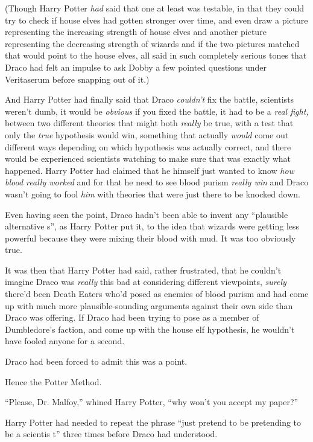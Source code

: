 (Though Harry Potter \emph{had} said that one at least was testable, in that they could try to check if house elves had gotten stronger over time, and even draw a picture representing the increasing strength of house elves and another picture representing the decreasing strength of wizards and if the two pictures matched that would point to the house elves, all said in such completely serious tones that Draco had felt an impulse to ask Dobby a few pointed questions under Veritaserum before snapping out of it.)

And Harry Potter had finally said that Draco \emph{couldn't} fix the battle, scientists weren't dumb, it would be \emph{obvious} if you fixed the battle, it had to be a \emph{real fight,} between two different theories that might both \emph{really} be true, with a test that only the \emph{true} hypothesis would win, something that actually \emph{would} come out different ways depending on which hypothesis was actually correct, and there would be experienced scientists watching to make sure that was exactly what happened. Harry Potter had claimed that he himself just wanted to know \emph{how blood really worked} and for that he need to see blood purism \emph{really win} and Draco wasn't going to fool \emph{him} with theories that were just there to be knocked down.

Even having seen the point, Draco hadn't been able to invent any ``plausible alternative s'', as Harry Potter put it, to the idea that wizards were getting less powerful because they were mixing their blood with mud. It was too obviously true.

It was then that Harry Potter had said, rather frustrated, that he couldn't imagine Draco was \emph{really} this bad at considering different viewpoints, \emph{surely} there'd been Death Eaters who'd posed as enemies of blood purism and had come up with much more plausible-sounding arguments against their own side than Draco was offering. If Draco had been trying to pose as a member of Dumbledore's faction, and come up with the house elf hypothesis, he wouldn't have fooled anyone for a second.

Draco had been forced to admit this was a point.

Hence the Potter Method.

``Please, Dr. Malfoy,'' whined Harry Potter, ``why won't you accept my paper?''

Harry Potter had needed to repeat the phrase ``just pretend to be pretending to be a scientis t'' three times before Draco had understood.

